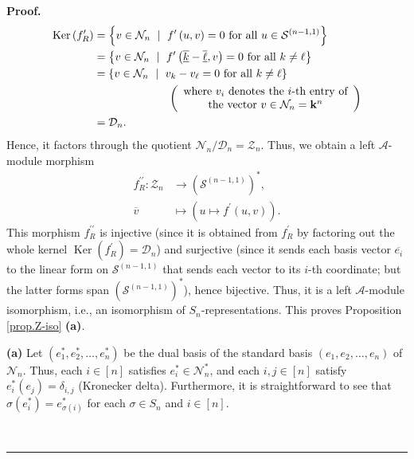 \documentclass[numbers=enddot,12pt,final,onecolumn,notitlepage]{scrartcl}%
\theoremstyle{definition}
\newenvironment{noncompile}{}{}
\newenvironment{proof}[1][Proof]{\noindent\textbf{#1.} }{\ \rule{0.5em}{0.5em}}
\begin{document}
\begin{proof}
\begin{noncompile}
\begin{align*}
\operatorname*{Ker}\left(  f_{R}^{\prime}\right)   &  =\left\{  v\in
\mathcal{N}_{n}\ \mid\ f^{\prime}\left(  u,v\right)  =0\text{ for all }%
u\in\mathcal{S}^{\left(  n-1,1\right)  }\right\} \\
&  =\left\{  v\in\mathcal{N}_{n}\ \mid\ f^{\prime}\left(  \underline{\overline
{k}}-\underline{\overline{\ell}},v\right)  =0\text{ for all }k\neq\ell\right\}
\\
&  =\left\{  v\in\mathcal{N}_{n}\ \mid\ v_{k}-v_{\ell}=0\text{ for all }%
k\neq\ell\right\} \\
&  \ \ \ \ \ \ \ \ \ \ \ \ \ \ \ \ \ \ \ \ \left(
\begin{array}
[c]{c}%
\text{where }v_{i}\text{ denotes the }i\text{-th entry of}\\
\text{the vector }v\in\mathcal{N}_{n}=\mathbf{k}^{n}%
\end{array}
\right) \\
&  =\mathcal{D}_{n}.
\end{align*}
Hence, it factors through the quotient $\mathcal{N}_{n}/\mathcal{D}%
_{n}=\mathcal{Z}_{n}$. Thus, we obtain a left $\mathcal{A}$-module morphism%
\begin{align*}
f_{R}^{\prime\prime}:\mathcal{Z}_{n}  &  \rightarrow\left(  \mathcal{S}%
^{\left(  n-1,1\right)  }\right)  ^{\ast},\\
\overline{v}  &  \mapsto\left(  u\mapsto f^{\prime}\left(  u,v\right)
\right)  .
\end{align*}
This morphism $f_{R}^{\prime\prime}$ is injective (since it is obtained from
$f_{R}^{\prime}$ by factoring out the whole kernel $\operatorname*{Ker}\left(
f_{R}^{\prime}\right)  =\mathcal{D}_{n}$) and surjective (since it sends each
basis vector $\overline{e_{i}}$ to the linear form on $\mathcal{S}^{\left(
n-1,1\right)  }$ that sends each vector to its $i$-th coordinate; but the
latter forms span $\left(  \mathcal{S}^{\left(  n-1,1\right)  }\right)
^{\ast}$), hence bijective. Thus, it is a left $\mathcal{A}$-module
isomorphism, i.e., an isomorphism of $S_{n}$-representations. This proves
Proposition \ref{prop.Z-iso} \textbf{(a)}. \medskip
\end{noncompile}

\textbf{(a)} Let $\left(  e_{1}^{\ast},e_{2}^{\ast},\ldots,e_{n}^{\ast
}\right)  $ be the dual basis of the standard basis $\left(  e_{1}%
,e_{2},\ldots,e_{n}\right)  $ of $\mathcal{N}_{n}$. Thus, each $i\in\left[
n\right]  $ satisfies $e_{i}^{\ast}\in\mathcal{N}_{n}^{\ast}$, and each
$i,j\in\left[  n\right]  $ satisfy $e_{i}^{\ast}\left(  e_{j}\right)
=\delta_{i,j}$ (Kronecker delta). Furthermore, it is straightforward to see
that $\sigma\left(  e_{i}^{\ast}\right)  =e_{\sigma\left(  i\right)  }^{\ast}$
for each $\sigma\in S_{n}$ and $i\in\left[  n\right]  $.


\end{proof}
\end{document}
